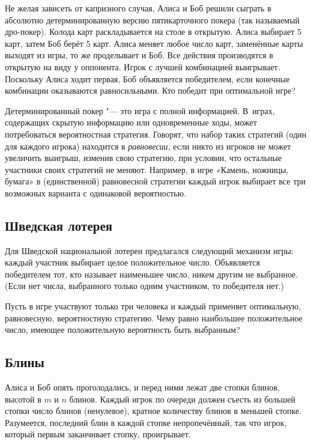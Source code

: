 \documentclass[twoside]{book}
\makeatletter
\newcommand{\rindex}[2][\imki@jobname]{%
  \index[#1]{\detokenize{#2}}%
}
\makeatother
\begin{document}
Не желая зависеть от капризного случая, Алиса и Боб решили сыграть в абсолютно детерминированную версию пятикарточного покера (так называемый дро-покер).
Колода карт раскладывается на столе в открытую.
Алиса выбирает 5 карт, затем Боб берёт 5 карт.
Алиса меняет любое число карт, заменённые карты выходят из игры, то же проделывает и Боб.
Все действия производятся в открытую на виду у оппонента.
Игрок с лучшей комбинацией выигрывает.
Поскольку Алиса ходит первая, Боб объявляется победителем, если конечные комбинации оказываются равносильными.
Кто победит при оптимальной игре?

\medskip

Детерминированный покер "--- это игра с полной информацией.
В~играх, содержащих скрытую информацию или одновременные ходы, может потребоваться вероятностная стратегия.
Говорят, что набор таких стратегий (один для каждого игрока) находится в \emph{равновесии}, если никто из игроков не может увеличить выигрыш, изменив свою стратегию, при условии, что остальные участники своих стратегий не меняют.
Например, в игре «Камень, ножницы, бумага» в (единственной) равновесной стратегии каждый игрок выбирает все три возможных варианта с одинаковой вероятностью.

\subsection*{Шведская лотерея}%
\rindex{Шведская лотерея}

Для Шведской национальной лотереи предлагался следующий механизм игры: каждый участник выбирает целое положительное число.
Объявляется победителем тот, кто называет наименьшее число, никем другим не выбранное.
(Если нет числа, выбранного только одним участником, то победителя нет.)

Пусть в игре участвуют только три человека и каждый применяет оптимальную, равновесную, вероятностную стратегию.
Чему равно наибольшее положительное число, имеющее положительную вероятность быть выбранным?

\subsection*{Блины}%
\rindex{Блины}

Алиса и Боб опять проголодались, и перед ними лежат две стопки блинов, высотой в $m$ и $n$ блинов.
Каждый игрок по очереди должен съесть из большей стопки число блинов (ненулевое), кратное количеству блинов в меньшей стопке.
Разумеется, последний блин в каждой стопке непропечённый, так что игрок, который первым заканчивает стопку, проигрывает.
\end{document}
